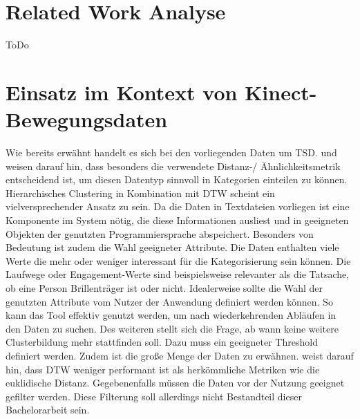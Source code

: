 \section{Related Work Analyse}
\label{chapter2-RelatedWork}
ToDo


\section{Einsatz im Kontext von Kinect-Bewegungsdaten}
\label{chapter2-Einsatz}
Wie bereits erwähnt handelt es sich bei den vorliegenden Daten um \ac{TSD}.
\citet{warren_liao_clustering_2005} und \citet{aghabozorgi_time-series_2015} weisen darauf hin,
dass besonders die verwendete Distanz-/ Ähnlichkeitsmetrik entscheidend ist,
um diesen Datentyp sinnvoll in Kategorien einteilen zu können.
Hierarchisches Clustering in Kombination mit \ac{DTW} scheint ein vielversprechender Ansatz zu sein.
Da die Daten in Textdateien vorliegen ist eine Komponente im System nötig,
die diese Informationen ausliest und in geeigneten Objekten der genutzten Programmiersprache abspeichert.
Besonders von Bedeutung ist zudem die Wahl geeigneter Attribute.
Die Daten enthalten viele Werte die mehr oder weniger interessant für die Kategorisierung sein können.
Die Laufwege oder Engagement-Werte sind beispielsweise relevanter als die Tatsache,
ob eine Person Brillenträger ist oder nicht.
Idealerweise sollte die Wahl der genutzten Attribute vom Nutzer der Anwendung definiert werden können.
So kann das Tool effektiv genutzt werden, um nach wiederkehrenden Abläufen in den Daten zu suchen.
Des weiteren stellt sich die Frage, ab wann keine weitere Clusterbildung mehr stattfinden soll.
Dazu muss ein geeigneter Threshold definiert werden.
Zudem ist die große Menge der Daten zu erwähnen.
\citet{aghabozorgi_time-series_2015} weist darauf hin,
dass \ac{DTW} weniger performant ist als herkömmliche Metriken wie die euklidische Distanz.
Gegebenenfalls müssen die Daten vor der Nutzung geeignet gefilter werden.
Diese Filterung soll allerdings nicht Bestandteil dieser Bachelorarbeit sein.